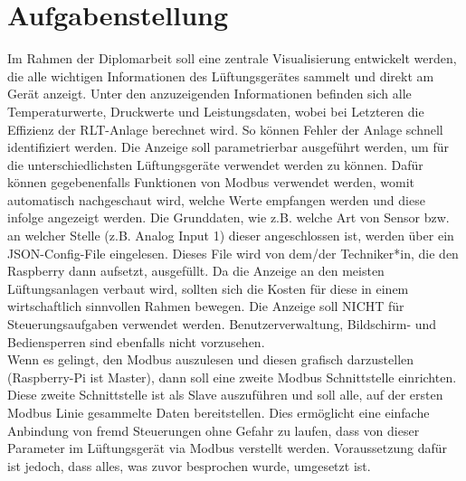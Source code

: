 \chapter{Aufgabenstellung} 
\label{aufgabenstellung}
Im Rahmen der Diplomarbeit soll eine zentrale Visualisierung entwickelt werden, die alle 
wichtigen Informationen des Lüftungsgerätes sammelt und direkt am Gerät anzeigt. Unter 
den anzuzeigenden Informationen befinden sich alle Temperaturwerte, Druckwerte und 
Leistungsdaten, wobei bei Letzteren die Effizienz der RLT-Anlage berechnet wird. So können 
Fehler der Anlage schnell identifiziert werden.
Die Anzeige soll parametrierbar ausgeführt werden, um für die unterschiedlichsten 
Lüftungsgeräte verwendet werden zu können. Dafür können gegebenenfalls Funktionen von 
Modbus verwendet werden, womit automatisch nachgeschaut wird, welche Werte empfangen 
werden und diese infolge angezeigt werden. Die Grunddaten, wie z.B. welche Art von 
Sensor bzw. an welcher Stelle (z.B. Analog Input 1) dieser angeschlossen ist, werden über 
ein JSON-Config-File eingelesen. Dieses File wird von dem/der Techniker*in, die den 
Raspberry dann aufsetzt, ausgefüllt.
Da die Anzeige an den meisten Lüftungsanlagen verbaut wird, sollten sich die Kosten für 
diese in einem wirtschaftlich sinnvollen Rahmen bewegen.
Die Anzeige soll NICHT für Steuerungsaufgaben verwendet werden. Benutzerverwaltung, 
Bildschirm- und Bediensperren sind ebenfalls nicht vorzusehen. \\

Wenn es gelingt, den Modbus auszulesen und diesen grafisch darzustellen (Raspberry-Pi ist 
Master), dann soll eine zweite Modbus Schnittstelle einrichten. Diese zweite 
Schnittstelle ist als Slave auszuführen und soll alle, auf der ersten Modbus Linie
gesammelte Daten bereitstellen. Dies ermöglicht eine einfache Anbindung von fremd 
Steuerungen ohne Gefahr zu laufen, dass von dieser Parameter im Lüftungsgerät via 
Modbus verstellt werden. Voraussetzung dafür ist jedoch, dass alles, was zuvor besprochen
wurde, umgesetzt ist.